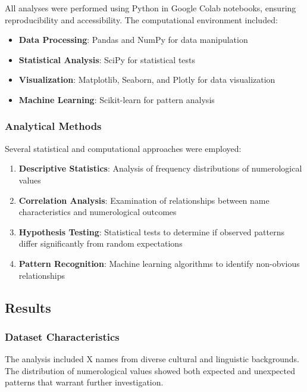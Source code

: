 \documentclass[
  11pt,
]{article}
\providecommand{\tightlist}{%
  \setlength{\itemsep}{0pt}\setlength{\parskip}{0pt}}
\begin{document}
All analyses were performed using Python in Google Colab notebooks,
ensuring reproducibility and accessibility. The computational
environment included:

\begin{itemize}
\tightlist
\item
  \textbf{Data Processing}: Pandas and NumPy for data manipulation
\item
  \textbf{Statistical Analysis}: SciPy for statistical tests
\item
  \textbf{Visualization}: Matplotlib, Seaborn, and Plotly for data
  visualization
\item
  \textbf{Machine Learning}: Scikit-learn for pattern analysis
\end{itemize}

\subsubsection{Analytical Methods}\label{analytical-methods}

Several statistical and computational approaches were employed:

\begin{enumerate}
\def\labelenumi{\arabic{enumi}.}
\tightlist
\item
  \textbf{Descriptive Statistics}: Analysis of frequency distributions
  of numerological values
\item
  \textbf{Correlation Analysis}: Examination of relationships between
  name characteristics and numerological outcomes
\item
  \textbf{Hypothesis Testing}: Statistical tests to determine if
  observed patterns differ significantly from random expectations
\item
  \textbf{Pattern Recognition}: Machine learning algorithms to identify
  non-obvious relationships
\end{enumerate}

\subsection{Results}\label{results}

\subsubsection{Dataset Characteristics}\label{dataset-characteristics}

The analysis included X names from diverse cultural and linguistic
backgrounds. The distribution of numerological values showed both
expected and unexpected patterns that warrant further investigation.
\end{document}
